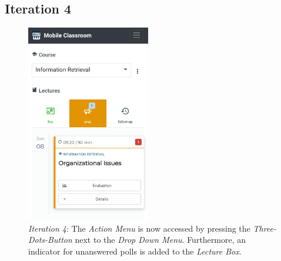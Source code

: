 \subsection{Iteration 4}
\begin{figure}
	\vspace*{-1cm}
	\begin{center}
		\includegraphics[width=0.48\textwidth]{screenshots/redesign/main_view_iteration_4.jpg}
	\end{center}
	\captionsetup{format=plain}
	\caption{\emph{Iteration 4}: The \emph{Action Menu} is now accessed by pressing the \emph{Three-Dots-Button} next to the \emph{Drop Down Menu}. Furthermore, an indicator for unanswered polls is added to the \emph{Lecture Box}.}
	\label{fig:main_view_iteration_4}
\end{figure}

